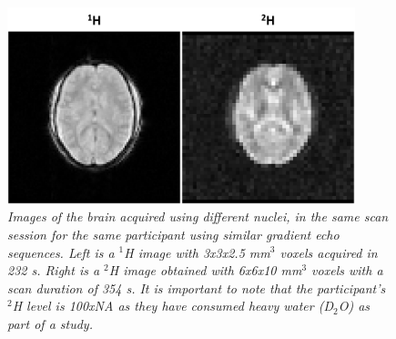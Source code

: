 \begin{figure}[ht]
    \centering
    \includegraphics[width=0.9\textwidth]{Figures/Intro/1H2H_Brain.png}
    \caption{\textit{Images of the brain acquired using different nuclei, in the same scan session for the same participant using similar gradient echo sequences. Left is a $^1$H image with 3\textnormal{x}3\textnormal{x}2.5 mm$^3$ voxels acquired in 232 s. Right is a $^2$H image obtained with 6\textnormal{x}6\textnormal{x}10 mm$^3$ voxels with a scan duration of 354 s. It is important to note that the participant's $^2$H level is 100\textnormal{x}\ac{NA} as they have consumed heavy water (D$_2$O) as part of a study.}}
    \label{fig:intro:1H2H_Brain}
\end{figure}

